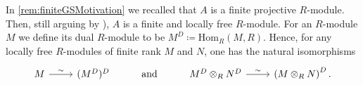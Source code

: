 \begin{rem}[]
	In \cref{rem:finiteGSMotivation} we recalled that $A$ is a finite projective $R$-module.
	Then, still arguing by
	\cite[\href{https://stacks.math.columbia.edu/tag/00NX}{Lemma 00NX}]{SP}),
	$A$ is a finite and locally free $R$-module.
	For an $R$-module $M$ we define its dual $R$-module to be
	$M^D \coloneqq \mathrm{Hom}_{R} \left( M, R \right)$.
	Hence, for any locally free $R$-modules of finite rank $M$ and $N$,
	one has the natural isomorphisms
	\begin{equation*}%
	\begin{tikzcd}
		M \arrow[r, "\sim", rightarrow] &
		(M^D)^D &
		\text{and} &
		M^D \otimes_R N^D \arrow[r, "\sim", rightarrow] &
		\left( M \otimes_R N \right)^D
	.\end{tikzcd}
	\end{equation*}
\end{rem}


